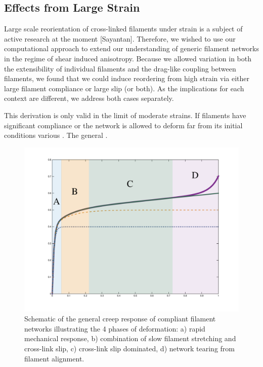 \documentclass[pre,reprint]{revtex4-1}
\begin{document}
\subsection{Effects from Large Strain}

Large scale reorientation of cross-linked filaments under strain is a subject of active research at the moment [Sayantan].  Therefore, we wished to use our computational approach to extend our understanding of generic filament networks in the regime of shear induced anisotropy.  Because we allowed variation in both the extensibility of individual filaments and the drag-like coupling between filaments, we found that we could induce reordering from high strain via either large filament compliance or large slip (or both).  As the implications for each context are different, we address both cases separately.

This derivation is only valid in the limit of moderate strains.  If filaments have significant compliance or the network is allowed to deform far from its initial conditions various .  The general .  


\begin{figure}[h!]
\centering
\includegraphics[width=\hsize]{shear_modes}
\caption{\label{fig:shear_modes}Schematic of the general creep response of compliant filament networks illustrating the 4 phases of deformation: a) rapid mechanical response, b) combination of slow filament stretching and cross-link slip, c) cross-link slip dominated, d) network tearing from filament alignment.}
\end{figure}
\end{document}
